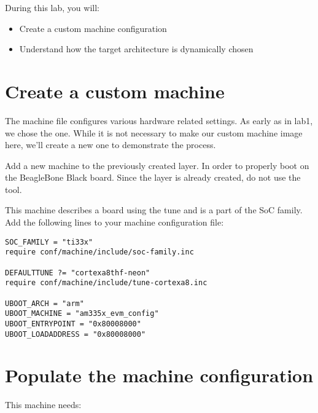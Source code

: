 
During this lab, you will:
\begin{itemize}
  \item Create a custom machine configuration
  \item Understand how the target architecture is dynamically chosen
\end{itemize}

\section{Create a custom machine}

The machine file configures various hardware related settings. As early as in
lab1, we chose the  one. While it is not necessary to
make our custom machine image here, we'll create a new one to demonstrate the
process.

Add a new  machine to the previously created layer. In order to
properly boot on the BeagleBone Black board. Since the
 layer is already created, do not use the
 tool.

This machine describes a board using the  tune
and is a part of the  SoC family. Add the following lines
to your machine configuration file:

\begin{verbatim}
SOC_FAMILY = "ti33x"
require conf/machine/include/soc-family.inc

DEFAULTTUNE ?= "cortexa8thf-neon"
require conf/machine/include/tune-cortexa8.inc

UBOOT_ARCH = "arm"
UBOOT_MACHINE = "am335x_evm_config"
UBOOT_ENTRYPOINT = "0x80008000"
UBOOT_LOADADDRESS = "0x80008000"
\end{verbatim}

\section{Populate the machine configuration}

This  machine needs:


